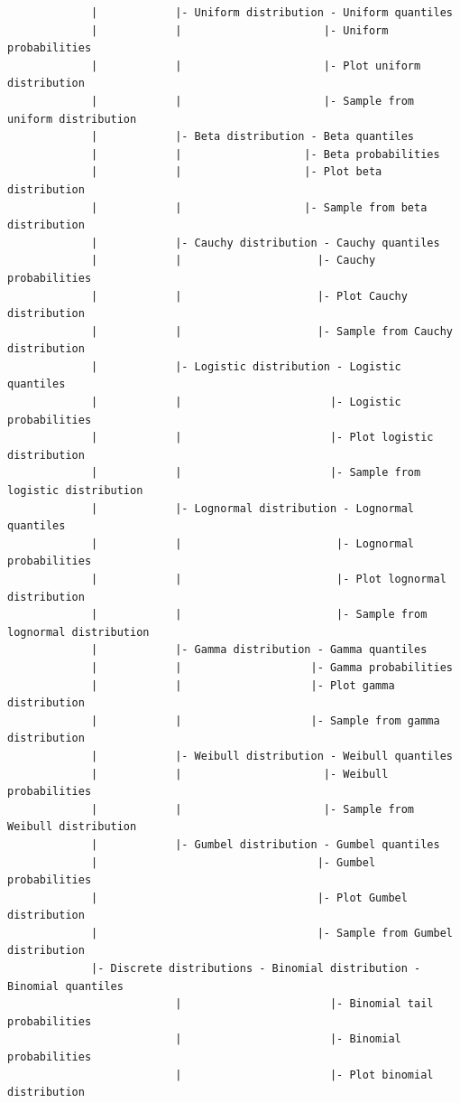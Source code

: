 \documentclass{article}%
\begin{document}
\begin{verbatim}
             |            |- Uniform distribution - Uniform quantiles
             |            |                      |- Uniform probabilities
             |            |                      |- Plot uniform distribution
             |            |                      |- Sample from uniform distribution
             |            |- Beta distribution - Beta quantiles
             |            |                   |- Beta probabilities
             |            |                   |- Plot beta distribution
             |            |                   |- Sample from beta distribution
             |            |- Cauchy distribution - Cauchy quantiles
             |            |                     |- Cauchy probabilities
             |            |                     |- Plot Cauchy distribution
             |            |                     |- Sample from Cauchy distribution
             |            |- Logistic distribution - Logistic quantiles
             |            |                       |- Logistic probabilities
             |            |                       |- Plot logistic distribution
             |            |                       |- Sample from logistic distribution
             |            |- Lognormal distribution - Lognormal quantiles
             |            |                        |- Lognormal probabilities
             |            |                        |- Plot lognormal distribution
             |            |                        |- Sample from lognormal distribution
             |            |- Gamma distribution - Gamma quantiles
             |            |                    |- Gamma probabilities
             |            |                    |- Plot gamma distribution
             |            |                    |- Sample from gamma distribution
             |            |- Weibull distribution - Weibull quantiles
             |            |                      |- Weibull probabilities
             |            |                      |- Sample from Weibull distribution
             |            |- Gumbel distribution - Gumbel quantiles
             |                                  |- Gumbel probabilities
             |                                  |- Plot Gumbel distribution
             |                                  |- Sample from Gumbel distribution
             |- Discrete distributions - Binomial distribution - Binomial quantiles
                          |                       |- Binomial tail probabilities
                          |                       |- Binomial probabilities
                          |                       |- Plot binomial distribution

\end{verbatim}
\end{document}
